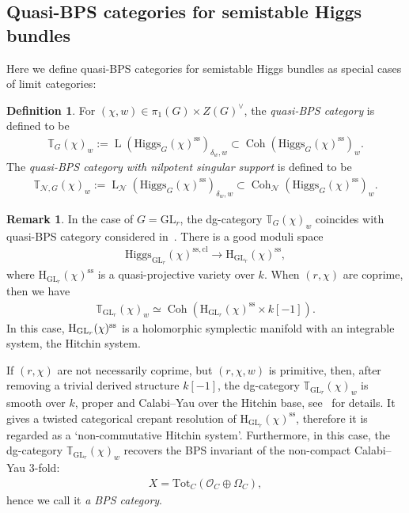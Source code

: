 \documentclass [11pt,oneside,a4paper,mathscr]{amsart}
\theoremstyle{definition}
\newtheorem{defn}[thm]{Definition}
\newtheorem{remark}[thm]{Remark}
\newcommand{\LL}{\operatorname{L}}
\newcommand{\Coh}{\operatorname{Coh}}
\newcommand{\GL}{\operatorname{GL}}
\newcommand{\Hig}{\mathrm{Higgs}}
\begin{document}
\subsection{Quasi-BPS categories for semistable Higgs bundles}\label{subsec:qBPS:ss}
Here we define quasi-BPS categories for semistable Higgs bundles as special 
cases of limit categories: 
\begin{defn}\label{def:qbpsG}
For $(\chi, w) \in \pi_1(G)\times Z(G)^{\vee}$, the \textit{quasi-BPS category} is defined 
to be 
\begin{align*}
    \mathbb{T}_G(\chi)_w:=\LL(\Hig_G(\chi)^{\mathrm{ss}})_{\delta_w, w} \subset \Coh(\Hig_G(\chi)^{\mathrm{ss}})_w.
\end{align*}
The \textit{quasi-BPS category with nilpotent singular support} is defined to be 
\begin{align*}
    \mathbb{T}_{\mathcal{N}, G}(\chi)_w:=\LL_{\mathcal{N}}(\Hig_G(\chi)^{\mathrm{ss}})_{\delta_w, w} \subset \Coh_{\mathcal{N}}(\Hig_G(\chi)^{\mathrm{ss}})_w.
\end{align*}
\end{defn}



\begin{remark}\label{rmk:GLr}
In the case of $G=\mathrm{GL}_r$, the dg-category $\mathbb{T}_G(\chi)_w$ coincides with quasi-BPS category 
    considered in~\cite{PThiggs}. 
    There is a good moduli space~\cite{AHPS} 
    \begin{align*}
        \Hig_{\GL_r}(\chi)^{\mathrm{ss, cl}}\to \mathrm{H}_{\GL_r}(\chi)^{\mathrm{ss}},
    \end{align*}
    where $\mathrm{H}_{\GL_r}(\chi)^{\mathrm{ss}}$ is a quasi-projective variety over $k$. 
    When $(r, \chi)$ are coprime, then we have 
    \begin{align*}
        \mathbb{T}_{\GL_r}(\chi)_w \simeq \Coh(\text{H}_{\GL_r}(\chi)^{\text{ss}}\times k[-1]).
    \end{align*}
    In this case, $\mathrm{H}_{\GL_r}(\chi)^{\rm{ss}}$ is a holomorphic 
    symplectic manifold with an integrable 
system, the Hitchin system. 

If $(r, \chi)$ are not necessarily coprime, but $(r, \chi, w)$ is primitive, then, after removing a trivial derived structure $k[-1]$, the dg-category $\mathbb{T}_{\GL_r}(\chi)_w$ is smooth over $k$, proper and Calabi–Yau over the Hitchin base, see~\cite{PThiggs, PThiggs2} for details. It gives a twisted categorical crepant resolution of $\mathrm{H}_{\GL_r}(\chi)^{\mathrm{ss}}$, 
    therefore it is regarded as a `non-commutative Hitchin system'.  Furthermore, in this case, the dg-category 
    $\mathbb{T}_{\GL_r}(\chi)_w$ recovers the BPS invariant
    of the non-compact Calabi–Yau 3-fold: 
    \begin{align*}X=\mathrm{Tot}_C(\mathcal{O}_C\oplus \Omega_C),
    \end{align*} hence we call it \textit{a BPS category}.
\end{remark}
\end{document}
